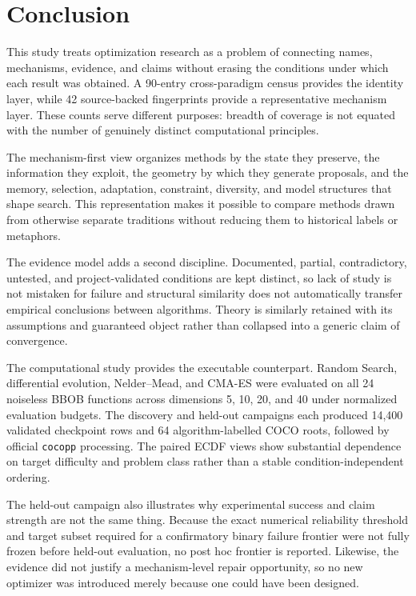 \section{Conclusion}
\label{sec:conclusion}

This study treats optimization research as a problem of connecting names, mechanisms, evidence, and claims without erasing the conditions under which each result was obtained. A 90-entry cross-paradigm census provides the identity layer, while 42 source-backed fingerprints provide a representative mechanism layer. These counts serve different purposes: breadth of coverage is not equated with the number of genuinely distinct computational principles.

The mechanism-first view organizes methods by the state they preserve, the information they exploit, the geometry by which they generate proposals, and the memory, selection, adaptation, constraint, diversity, and model structures that shape search. This representation makes it possible to compare methods drawn from otherwise separate traditions without reducing them to historical labels or metaphors.

The evidence model adds a second discipline. Documented, partial, contradictory, untested, and project-validated conditions are kept distinct, so lack of study is not mistaken for failure and structural similarity does not automatically transfer empirical conclusions between algorithms. Theory is similarly retained with its assumptions and guaranteed object rather than collapsed into a generic claim of convergence.

The computational study provides the executable counterpart. Random Search, differential evolution, Nelder--Mead, and CMA-ES were evaluated on all 24 noiseless BBOB functions across dimensions 5, 10, 20, and 40 under normalized evaluation budgets. The discovery and held-out campaigns each produced 14,400 validated checkpoint rows and 64 algorithm-labelled COCO roots, followed by official \texttt{cocopp} processing. The paired ECDF views show substantial dependence on target difficulty and problem class rather than a stable condition-independent ordering.

The held-out campaign also illustrates why experimental success and claim strength are not the same thing. Because the exact numerical reliability threshold and target subset required for a confirmatory binary failure frontier were not fully frozen before held-out evaluation, no post hoc frontier is reported. Likewise, the evidence did not justify a mechanism-level repair opportunity, so no new optimizer was introduced merely because one could have been designed.

